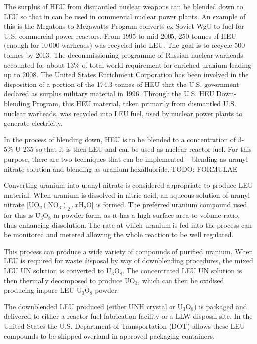 \documentclass[twoside,titlepage,11pt,twocolumn,a4paper]{article}
\begin{document}
The surplus of HEU from dismantled nuclear weapons can be blended down
to LEU so that in can be used in commercial nuclear power plants. An
example of this is the Megatons to Megawatts Program converts
ex-Soviet WgU to fuel for U.S. commercial power reactors. From 1995 to
mid-2005, 250 tonnes of HEU (enough for 10\,000 warheads) was recycled
into LEU. The goal is to recycle 500 tonnes by 2013. The
decommissioning programme of Russian nuclear warheads accounted for
about 13\% of total world requirement for enriched uranium leading up
to 2008. \citep{uraniumEnrichment} The United States Enrichment
Corporation has been involved in the disposition of a portion of the
174.3 tonnes of HEU that the U.S. government declared as surplus
military material in 1996. Through the U.S. HEU Down-blending Program,
this HEU material, taken primarily from dismantled U.S. nuclear
warheads, was recycled into LEU fuel, used by nuclear power plants to
generate electricity.

In the process of blending down, HEU is to be blended to a
concentration of 3-5\% U-235 so that it is then LEU and can be used as
nuclear reactor fuel. For this purpose, there are two techniques that
can be implemented -- blending as uranyl nitrate solution and blending
as uranium hexafluoride. TODO: FORMULAE

Converting uranium into uranyl nitrate is considered appropriate to
produce LEU material.  When uranium is dissolved in nitric acid, an
aqueous solution of uranyl nitrate
[\(\mathrm{UO_2(NO_3)_2\,.\,}x\mathrm{H_2O}\)] is formed. The
preferred uranium compound used for this is \(\mathrm{U_3O_8}\) in
powder form, as it has a high surface-area-to-volume ratio, thus
enhancing dissolution. The rate at which uranium is fed into the
process can be monitored and metered allowing the whole reaction to be
well regulated.

This process can produce a wide variety of compounds of purified
uranium. When LEU is required for waste disposal by way of
downblending procedures, the mixed LEU UN solution is converted to
\(\mathrm{U_3O_8}\). The concentrated LEU UN solution is then
thermally decomposed to produce \(\mathrm{UO_3}\), which can then be
oxidised producing impure LEU \(\mathrm{U_3O_8}\) powder.

The downblended LEU produced (either UNH crystal or
\(\mathrm{U_3O_8}\)) is packaged and delivered to either a reactor
fuel fabrication facility or a LLW disposal site. In the United States
the U.S. Department of Transportation (DOT) allows these LEU compounds
to be shipped overland in approved packaging containers.
\end{document}

